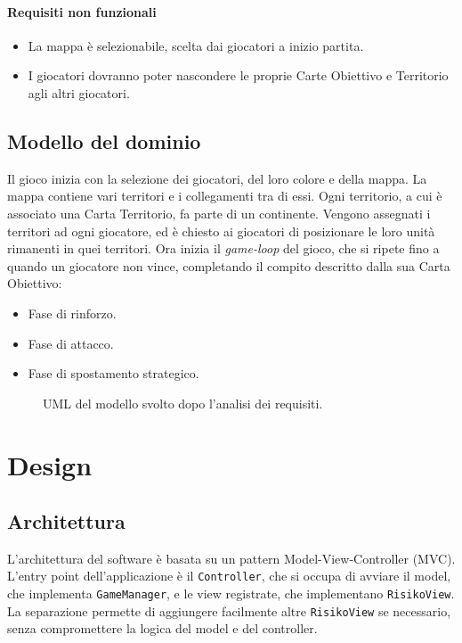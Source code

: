 \documentclass[a4paper,12pt]{report}
\begin{document}
\subsubsection{Requisiti non funzionali}
\begin{itemize}
	\item La mappa è selezionabile, scelta dai giocatori a inizio partita.
	\item I giocatori dovranno poter nascondere le proprie Carte Obiettivo e Territorio agli altri giocatori.
\end{itemize}

\section{Modello del dominio}

Il gioco inizia con la selezione dei giocatori, del loro colore e della mappa.
La mappa contiene vari territori e i collegamenti tra di essi. Ogni territorio, a cui è associato una Carta Territorio, fa parte di un continente.
Vengono assegnati i territori ad ogni giocatore, ed è chiesto ai giocatori di posizionare le loro unità rimanenti in quei territori.
Ora inizia il \textit{game-loop} del gioco, che si ripete fino a quando un giocatore non vince, completando il compito descritto dalla sua Carta Obiettivo:
\begin{itemize}
	\item Fase di rinforzo.
	\item Fase di attacco.
	\item Fase di spostamento strategico.
\end{itemize}

\begin{figure}[H]
	\centering
	
	\caption{UML del modello svolto dopo l'analisi dei requisiti.}
\end{figure}

\chapter{Design}

\section{Architettura}

L'architettura del software è basata su un pattern Model-View-Controller (MVC).
L'entry point dell'applicazione è il \texttt{Controller}, che si occupa di avviare il model, che implementa \texttt{GameManager}, e le view registrate, che implementano \texttt{RisikoView}.
La separazione permette di aggiungere facilmente altre \texttt{RisikoView} se necessario, senza compromettere la logica del model e del controller.
\end{document}
